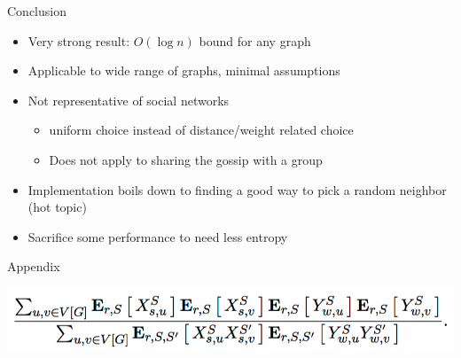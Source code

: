 \documentclass{beamer}
\begin{document}
\begin{frame}{Conclusion}

\begin{itemize}
  \item Very strong result: $O(\log n)$ bound for any graph
  \item Applicable to wide range of graphs, minimal assumptions
  \item Not representative of social networks
  \begin{itemize}
    \item uniform choice instead of distance/weight related choice
    \item Does not apply to sharing the gossip with a group
  \end{itemize}
  \item Implementation boils down to finding a good way to pick a random neighbor (hot topic)
  \item Sacrifice some performance to need less entropy
\end{itemize}
  
\end{frame}

\begin{frame}
  
\end{frame}

\begin{frame}{Appendix}
  \begin{center}
    \includegraphics[width=1\linewidth]{lower_bound_exp.png}
  \end{center}
\end{frame}
\end{document}
